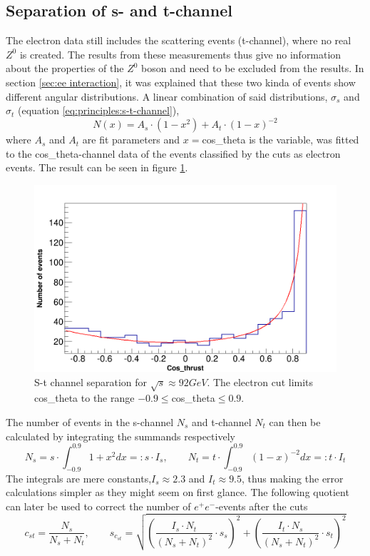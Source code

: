 \subsection{Separation of s- and t-channel}
The electron data still includes the scattering events (t-channel), where no real $Z^0$ is created. The results from these measurements thus give no information about the properties of the $Z^0$ boson and need to be excluded from the results. In section \ref{sec:ee interaction}, it was explained that these two kinda of events show different angular distributions. A linear combination of said distributions, $\sigma_s$ and $\sigma_t$ (equation \ref{eq:principles:s-t-channel}),
\begin{equation}
N(x)=A_s\cdot(1-x^2)+A_t\cdot(1-x)^{-2}
\end{equation}
where $A_s$ and $A_t$ are fit parameters and $x=$cos\_theta is the variable, was fitted to the cos\_theta-channel data of the events classified by the cuts as electron events. The result can be seen in figure \ref{fig:stchannelseparation}.
\begin{figure}
\centering
\includegraphics[width=1.0\linewidth]{../results/data_results/cosp_fits/stchannelexample46.png}
\caption[s-t-channel separation $\sqrt{s}\approx\unit{92}{GeV}$ GeV]{S-t channel separation for $\sqrt{s}\approx\unit{92}{GeV}$. The electron cut limits cos\_theta to the range $-0.9\le$cos\_theta$\le0.9$.}
\label{fig:stchannelseparation}
\end{figure}
The number of events in the s-channel $N_s$ and t-channel $N_t$ can then be calculated by integrating the summands respectively
\begin{equation}
N_s=s\cdot\int_{-0.9}^{0.9}1+x^2dx=:s\cdot I_s,\qquad N_t=t\cdot\int_{-0.9}^{0.9}(1-x)^{-2}dx=:t\cdot I_t
\end{equation}
The integrals are mere constants,$I_s\approx2.3$ and $I_t\approx9.5$, thus making the error calculations simpler as they might seem on first glance. The following quotient can later be used to correct the number of $e^+e^-$-events after the cuts
\begin{equation}
c_{st}=\frac{N_s}{N_s+N_t},\qquad s_{c_{st}}=\sqrt{\left(\frac{I_s\cdot N_t}{(N_s+N_t)^2}\cdot s_s\right)^2+\left(\frac{I_t\cdot N_s}{(N_s+N_t)^2}\cdot s_t\right)^2}
\end{equation}

